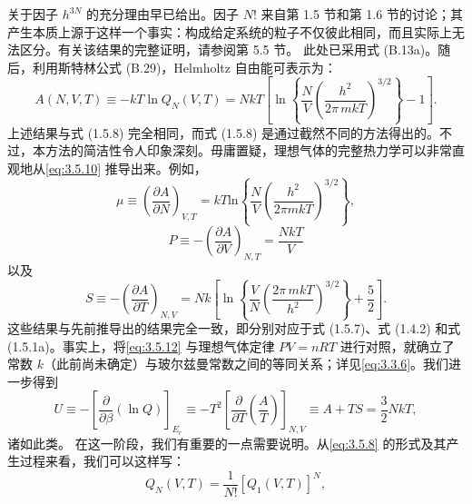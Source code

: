 关于因子 \(h^{3N}\) 的充分理由早已给出。因子 \(N!\) 来自第 1.5 节和第 1.6 节的讨论；其产生本质上源于这样一个事实：构成给定系统的粒子不仅彼此相同，而且实际上无法区分。有关该结果的完整证明，请参阅第 5.5 节。
此处已采用式 (B.13a)。随后，利用斯特林公式 (B.29)，Helmholtz 自由能可表示为：
\begin{equation}\tag{3.5.9}\label{eq:3.5.9}
A ( N , V , T ) \equiv - k T \ln Q _ { N } ( V , T ) = N k T \left[ \ln \left\{ \frac { N } { V } \left( \frac { h ^{2} } { 2 \pi \, m k T } \right) ^{3 / 2} \right\} - 1 \right] .
\end{equation}
上述结果与式 (1.5.8) 完全相同，而式 (1.5.8) 是通过截然不同的方法得出的。不过，本方法的简洁性令人印象深刻。毋庸置疑，理想气体的完整热力学可以非常直观地从\autoref{eq:3.5.10} 推导出来。例如，
\begin{equation}\tag{3.5.10}\label{eq:3.5.10}
\mu \equiv \left( \frac { \partial A } { \partial N } \right) _ { V , T } = k T \mathrm { l n } \left\{ \frac { N } { V } \left( \frac { h ^{2} } { 2 \pi m k T } \right) ^{3 / 2} \right\} ,
\end{equation}
\begin{equation}\tag{3.5.11}\label{eq:3.5.11}
P \equiv - \left( { \frac { \partial A } { \partial V } } \right) _ { N , T } = { \frac { N k T } { V } }
\end{equation}
以及
\begin{equation}\tag{3.5.12}\label{eq:3.5.12}
S \equiv - \left( \frac { \partial A } { \partial T } \right) _ { N , V } = N k \left[ \ln \left\{ \frac { V } { N } \left( \frac { 2 \pi \, m k T } { h ^{2} } \right) ^{3 / 2} \right\} + \frac { 5 } { 2 } \right] .
\end{equation}
这些结果与先前推导出的结果完全一致，即分别对应于式 (1.5.7)、式 (1.4.2) 和式 (1.5.1a)。事实上，将\autoref{eq:3.5.12} 与理想气体定律 \(PV = nRT\) 进行对照，就确立了常数 \(k\)（此前尚未确定）与玻尔兹曼常数之间的等同关系；详见\autoref{eq:3.3.6}。我们进一步得到
\begin{equation}\tag{3.5.13}\label{eq:3.5.13}
U \equiv - \left[ \frac { \partial } { \partial \beta } ( \ln Q ) \right] _ { E _ { r } } \equiv - T ^{2} \left[ \frac { \partial } { \partial T } \left( \frac { A } { T } \right) \right] _ { N , V } \equiv A + T S = \frac { 3 } { 2 } N k T ,
\end{equation}
诸如此类。
在这一阶段，我们有重要的一点需要说明。从\autoref{eq:3.5.8} 的形式及其产生过程来看，我们可以这样写：
\begin{equation}\tag{3.5.14}\label{eq:3.5.14}
Q _ { N } ( V , T ) = \frac { 1 } { N ! } [ Q _ { 1 } ( V , T ) ] ^{N} ,
\end{equation}
